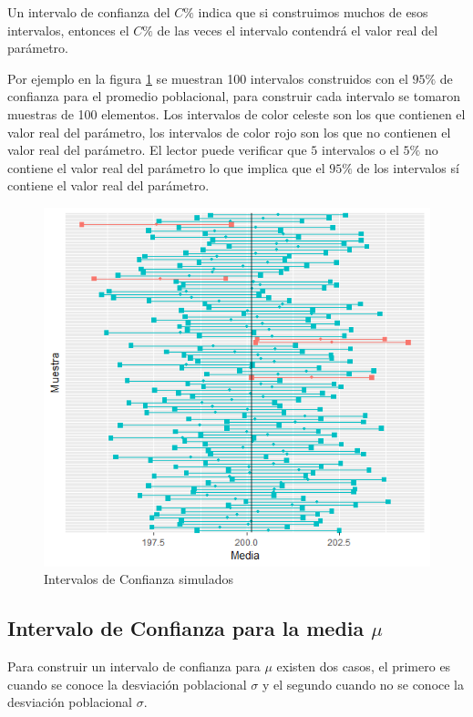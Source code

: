 \documentclass[
]{krantz}
\begin{document}
Un intervalo de confianza del \(C \%\) indica que si construimos muchos de esos intervalos, entonces el \(C \%\) de las veces el intervalo contendrá el valor real del parámetro.

Por ejemplo en la figura \ref{fig:ic} se muestran 100 intervalos construidos con el \(95 \%\) de confianza para el promedio poblacional, para construir cada intervalo se tomaron muestras de 100 elementos. Los intervalos de color celeste son los que contienen el valor real del parámetro, los intervalos de color rojo son los que no contienen el valor real del parámetro. El lector puede verificar que \(5\) intervalos o el \(5 \%\) no contiene el valor real del parámetro lo que implica que el \(95 \%\) de los intervalos sí contiene el valor real del parámetro.

\begin{figure}[h!]

{\centering \includegraphics[width=0.7\linewidth]{ic} 

}

\caption{Intervalos de Confianza simulados}\label{fig:ic}
\end{figure}

\hypertarget{icmu}{%
\subsection{\texorpdfstring{Intervalo de Confianza para la media \(\mu\)}{Intervalo de Confianza para la media \textbackslash{}mu}}\label{icmu}}

Para construir un intervalo de confianza para \(\mu\) existen dos casos, el primero es cuando se conoce la desviación poblacional \(\sigma\) y el segundo cuando no se conoce la desviación poblacional \(\sigma\).
\end{document}
